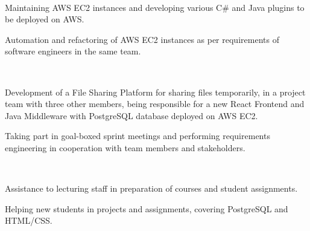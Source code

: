 \documentclass[]{deedy-resume-openfont}
\begin{document}
\sectionsep

\\ 
\begin{tightemize}
	\item Maintaining AWS EC2 instances and developing various C\# and Java plugins to be deployed on AWS.
	\item Automation and refactoring of AWS EC2 instances as per requirements of software engineers in the same team.
\end{tightemize}

\sectionsep

\\ 
\begin{tightemize}
	\item Development of a File Sharing Platform for sharing files temporarily, in a project team with three other members, being responsible for a new React Frontend and Java Middleware with PostgreSQL database deployed on AWS EC2.
	\item Taking part in goal-boxed sprint meetings and performing requirements engineering in cooperation with team members and stakeholders.
\end{tightemize}

\sectionsep

\\ 
\begin{tightemize}
	\item Assistance to lecturing staff in preparation of courses and student assignments.
	\item Helping new students in projects and assignments, covering PostgreSQL and HTML/CSS.
\end{tightemize}

\sectionsep



%
%
\end{document}
